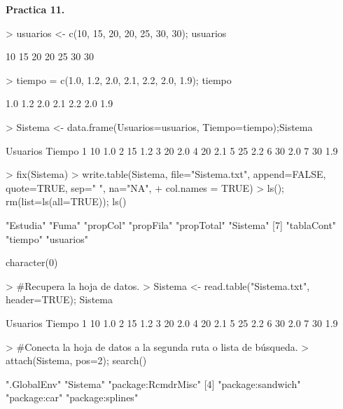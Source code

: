 \documentclass{article}
\begin{document}
\textbf{Practica 11.}

\begin{Schunk}
\begin{Sinput}
> usuarios <- c(10, 15, 20, 20, 25, 30, 30); usuarios
\end{Sinput}
\begin{Soutput}
[1] 10 15 20 20 25 30 30
\end{Soutput}
\begin{Sinput}
> tiempo = c(1.0, 1.2, 2.0, 2.1, 2.2, 2.0, 1.9); tiempo
\end{Sinput}
\begin{Soutput}
[1] 1.0 1.2 2.0 2.1 2.2 2.0 1.9
\end{Soutput}
\begin{Sinput}
> Sistema <- data.frame(Usuarios=usuarios, Tiempo=tiempo);Sistema
\end{Sinput}
\begin{Soutput}
  Usuarios Tiempo
1       10    1.0
2       15    1.2
3       20    2.0
4       20    2.1
5       25    2.2
6       30    2.0
7       30    1.9
\end{Soutput}
\begin{Sinput}
> fix(Sistema)
> write.table(Sistema, file="Sistema.txt", append=FALSE, quote=TRUE, sep=" ", na="NA",
+ col.names = TRUE)
> ls(); rm(list=ls(all=TRUE)); ls()
\end{Sinput}
\begin{Soutput}
[1] "Estudia"   "Fuma"      "propCol"   "propFila"  "propTotal" "Sistema"  
[7] "tablaCont" "tiempo"    "usuarios" 
\end{Soutput}
\begin{Soutput}
character(0)
\end{Soutput}
\begin{Sinput}
> #Recupera la hoja de datos.
> Sistema <- read.table("Sistema.txt", header=TRUE); Sistema
\end{Sinput}
\begin{Soutput}
  Usuarios Tiempo
1       10    1.0
2       15    1.2
3       20    2.0
4       20    2.1
5       25    2.2
6       30    2.0
7       30    1.9
\end{Soutput}
\begin{Sinput}
> #Conecta la hoja de datos a la segunda ruta o lista de búsqueda.
> attach(Sistema, pos=2); search()
\end{Sinput}
\begin{Soutput}
 [1] ".GlobalEnv"        "Sistema"           "package:RcmdrMisc"
 [4] "package:sandwich"  "package:car"       "package:splines"  

\end{Soutput}
\end{Schunk}
\end{document}
